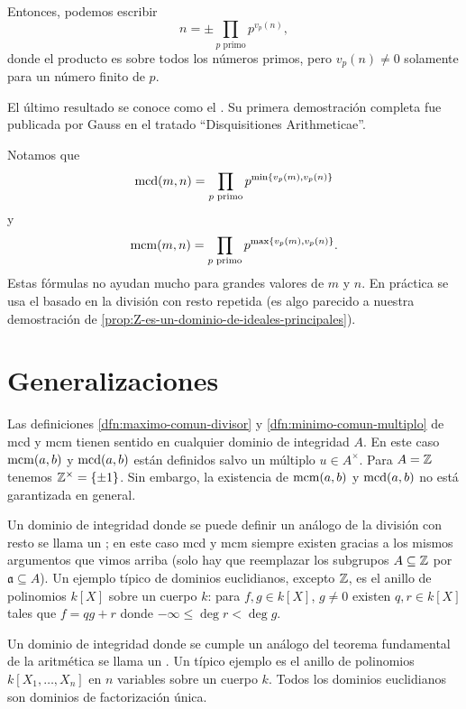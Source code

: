 \documentclass{article}
\numberwithin{equation}{section}
\begin{document}
Entonces, podemos escribir
$$n = \pm \prod_{p\text{ primo}} p^{v_p (n)},$$
donde el producto es sobre todos los números primos, pero
$v_p (n) \ne 0$ solamente para un número finito de $p$.

El último resultado se conoce como el
.  Su primera demostración completa fue publicada por Gauss en
el tratado ``Disquisitiones Arithmeticae''.

Notamos que
$$\operatorname{mcd} (m,n) = \prod_{p\text{ primo}} p^{\min \{v_p (m), v_p (n)\}}$$
y
$$\operatorname{mcm} (m,n) = \prod_{p\text{ primo}} p^{\max \{v_p (m), v_p (n)\}}.$$
Estas fórmulas no ayudan mucho para grandes valores de $m$ y $n$. En práctica
se usa el  basado en
la división con resto repetida (es algo parecido a nuestra demostración de
\ref{prop:Z-es-un-dominio-de-ideales-principales}).


\section{Generalizaciones}

Las definiciones \ref{dfn:maximo-comun-divisor} y
\ref{dfn:minimo-comun-multiplo} de mcd y mcm tienen sentido en cualquier dominio
de integridad $A$. En este caso $\operatorname{mcm} (a,b)$ y $\operatorname{mcd} (a,b)$ están definidos
salvo un múltiplo $u\in A^\times$. Para $A = \mathbb{Z}$ tenemos
$\mathbb{Z}^\times = \{ \pm 1 \}$. Sin embargo, la existencia de $\operatorname{mcm} (a,b)$ y
$\operatorname{mcd} (a,b)$ no está garantizada en general.

Un dominio de integridad donde se puede definir un análogo de la división con
resto se llama un ; en este caso mcd y mcm siempre
existen gracias a los mismos argumentos que vimos arriba (solo hay que
reemplazar los subgrupos $A \subseteq \mathbb{Z}$ por 
$\mathfrak{a} \subseteq A$). Un ejemplo típico de dominios euclidianos, excepto
$\mathbb{Z}$, es el anillo de polinomios $k [X]$ sobre un cuerpo $k$: para
$f,g\in k [X]$, $g\ne 0$ existen $q,r\in k[X]$ tales que $f = qg + r$ donde
$-\infty \le \deg r < \deg g$.

Un dominio de integridad donde se cumple un análogo del teorema fundamental de
la aritmética se llama un . Un típico ejemplo
es el anillo de polinomios $k [X_1,\ldots,X_n]$ en $n$ variables sobre un cuerpo
$k$. Todos los dominios euclidianos son dominios de factorización única.
\end{document}
